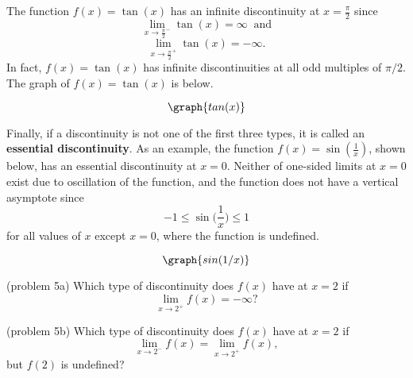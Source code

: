 \documentclass{ximera}
\begin{document}
\begin{example}[example 5]
The function $f(x) = \tan(x)$ has an infinite discontinuity at $x = \frac{\pi}{2}$
since
\[\lim_{x \to \frac{\pi}{2}^-} \tan(x) = \infty \ \text {  and}\]
\[\lim_{x \to \frac{\pi}{2}^+} \tan(x) = -\infty.\]
In fact, $f(x) = \tan(x)$ has infinite discontinuities at all odd multiples of $\pi/2$. 
The graph of $f(x) = \tan(x)$ is below.

\[
\graph{tan(x)}
\]

\end{example}


Finally, if a discontinuity is not one of the first three types, it is called an 
\textbf{essential discontinuity}.
As an example, the function $f(x) = \sin(\frac{1}{x})$, shown below, has an essential discontinuity at $x = 0$.
Neither of one-sided limits at $x=0$ exist due to oscillation of the function, 
and the function does not have a vertical asymptote since 
\[-1 \leq \sin\big(\frac{1}{x}\big) \leq 1 \]
for all values of $x$ except $x = 0$, where the function is undefined.

\[
\graph{sin(1/x)}
\]




\begin{problem}(problem 5a)
Which type of discontinuity does $f(x)$ have at $x=2$ if
\[
\lim_{x \to 2^+} f(x) = -\infty?
\]

\begin{multipleChoice}
\end{multipleChoice}
\end{problem}

\begin{problem}(problem 5b)
Which type of discontinuity does $f(x)$ have at $x=2$ if
\[
\lim_{x \to 2^-} f(x) = \lim_{x \to 2^+} f(x),
\]
but $f(2)$ is undefined?
\begin{multipleChoice}
\end{multipleChoice}
\end{problem}
\end{document}
